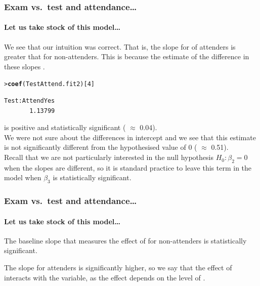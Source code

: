 \documentclass{beamer}\usepackage[]{graphicx}\usepackage[]{xcolor}
\makeatletter
\newcommand{\hlnum}[1]{\textcolor[rgb]{0.686,0.059,0.569}{#1}}%
\newcommand{\hlstd}[1]{\textcolor[rgb]{0.345,0.345,0.345}{#1}}%
\newcommand{\hlkwd}[1]{\textcolor[rgb]{0.737,0.353,0.396}{\textbf{#1}}}%
\newenvironment{kframe}{%
 \def\at@end@of@kframe{}%
 \ifinner\ifhmode%
  \def\at@end@of@kframe{\end{minipage}}%
  \begin{minipage}{\columnwidth}%
 \fi\fi%
 \def\FrameCommand##1{\hskip\@totalleftmargin \hskip-\fboxsep
 \colorbox{shadecolor}{##1}\hskip-\fboxsep
     \hskip-\linewidth \hskip-\@totalleftmargin \hskip\columnwidth}%
 \MakeFramed {\advance\hsize-\width
   \@totalleftmargin\z@ \linewidth\hsize
   \@setminipage}}%
 {\par\unskip\endMakeFramed%
 \at@end@of@kframe}
\newenvironment{knitrout}{}{} %
\makeatother
\begin{document}
\begin{frame}[fragile]
\frametitle{Exam vs.\ test \textbf{and} attendance\ldots}
\framesubtitle{Let us take stock of this model\ldots}

We see that our intuition was correct. 
That is, the slope for  of attenders is greater that for non-attenders. 
This is because the estimate of the difference in these slopes .

\begin{knitrout}\scriptsize
{}\color{fgcolor}\begin{kframe}
\begin{alltt}
\hlstd{> }\hlkwd{coef}\hlstd{(TestAttend.fit2)[}\hlnum{4}\hlstd{]}
\end{alltt}
\begin{verbatim}
Test:AttendYes 
       1.13799 
\end{verbatim}
\end{kframe}
\end{knitrout}
is positive and statistically significant (\pval{} $\approx$ 0.04).\\
\bigskip
We were not sure about the differences in intercept and we see that this estimate is not significantly different from the hypothesised value of 0 (\pval{} $\approx$ 0.51).\\
\bigskip
Recall that we are not particularly interested in the null hypothesis $H_0: \beta_2=0$ when the slopes are different, so it is standard practice to leave this term in the model when $\beta_3$ is statistically significant.
\end{frame}


\begin{frame}[fragile]
\frametitle{Exam vs.\ test \textbf{and} attendance\ldots}
\framesubtitle{Let us take stock of this model\ldots}

The baseline slope that measures the effect of  for non-attenders is statistically significant. 

\bigskip
The slope for attenders is significantly higher,
so we say that the effect of  interacts with the  variable,
as the effect depends on the level of .
\end{frame}
\end{document}
